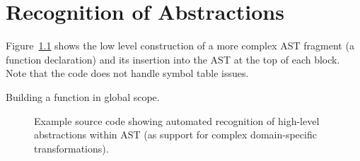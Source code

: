 \chapter{Recognition of Abstractions}

   Figure~\ref{Tutorial:exampleRecognitionOfAbstractions} shows the low level
construction of a more complex AST fragment (a function declaration) and its insertion 
into the AST at the top of each block.  Note that the code does not handle 
symbol table issues.

   Building a function in global scope.

\begin{figure}[!h]
{\indent
{\mySmallFontSize

\label{Tutorial:exampleRecognitionOfAbstractions}

\begin{latexonly}
   
\end{latexonly}

\begin{htmlonly}
   
\end{htmlonly}

}
}
\caption{Example source code showing automated recognition of high-level abstractions
    within AST (as support for complex domain-specific transformations).}
\end{figure}
